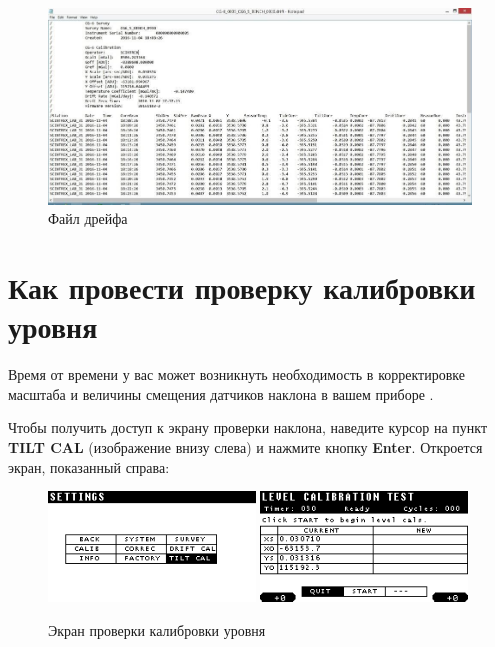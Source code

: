 \begin{figure}[H]
  \centering
  \includegraphics[width=\textwidth]{figures/the_drift_file}
  \caption{Файл дрейфа}
  \label{fig:the_drift_file}
\end{figure}

\section{Как провести проверку калибровки уровня}

Время от времени у вас может возникнуть необходимость в корректировке масштаба и
величины смещения датчиков наклона в вашем приборе \cg{}.


Чтобы получить доступ к экрану проверки наклона, наведите курсор на пункт
\textbf{TILT CAL} (изображение внизу слева) и нажмите кнопку \textbf{Enter}.
Откроется экран, показанный справа:

\newpage
\begin{figure}[H]
  \centering
  \includegraphics[width=0.49\textwidth]{figures/the_level_calibration_test_screen_1}
  \includegraphics[width=0.49\textwidth]{figures/the_level_calibration_test_screen_2}
  \caption{Экран проверки калибровки уровня}
  \label{fig:the_level_calibration_test_screen}
\end{figure}

